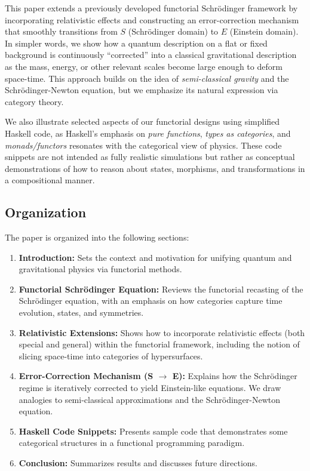 \documentclass[12pt]{article}
\begin{document}
This paper extends a previously developed functorial Schr\"odinger framework by incorporating relativistic effects and constructing an error-correction mechanism that smoothly transitions from \(S\) (Schr\"odinger domain) to \(E\) (Einstein domain). In simpler words, we show how a quantum description on a flat or fixed background is continuously ``corrected'' into a classical gravitational description as the mass, energy, or other relevant scales become large enough to deform space-time. This approach builds on the idea of \emph{semi-classical gravity} and the Schr\"odinger-Newton equation, but we emphasize its natural expression via category theory.

We also illustrate selected aspects of our functorial designs using simplified Haskell code, as Haskell's emphasis on \emph{pure functions}, \emph{types as categories}, and \emph{monads/functors} resonates with the categorical view of physics. These code snippets are not intended as fully realistic simulations but rather as conceptual demonstrations of how to reason about states, morphisms, and transformations in a compositional manner.

\subsection{Organization}
The paper is organized into the following sections:
\begin{enumerate}
    \item \textbf{Introduction:} Sets the context and motivation for unifying quantum and gravitational physics via functorial methods.
    \item \textbf{Functorial Schr\"odinger Equation:} Reviews the functorial recasting of the Schr\"odinger equation, with an emphasis on how categories capture time evolution, states, and symmetries.
    \item \textbf{Relativistic Extensions:} Shows how to incorporate relativistic effects (both special and general) within the functorial framework, including the notion of slicing space-time into categories of hypersurfaces.
    \item \textbf{Error-Correction Mechanism (S \(\to\) E):} Explains how the Schr\"odinger regime is iteratively corrected to yield Einstein-like equations. We draw analogies to semi-classical approximations and the Schr\"odinger-Newton equation.
    \item \textbf{Haskell Code Snippets:} Presents sample code that demonstrates some categorical structures in a functional programming paradigm.
    \item \textbf{Conclusion:} Summarizes results and discusses future directions.
\end{enumerate}
\end{document}
